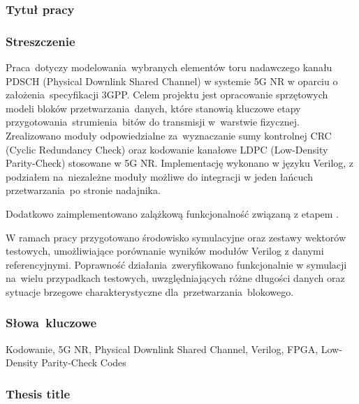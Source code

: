 \subsubsection*{Tytuł pracy} 
\Title

\subsubsection*{Streszczenie}  
Praca~dotyczy modelowania~wybranych elementów toru nadawczego kanału PDSCH (Physical Downlink Shared Channel) w systemie 5G NR w oparciu o założenia~specyfikacji 3GPP. Celem projektu jest opracowanie sprzętowych modeli bloków przetwarzania~danych, które stanowią kluczowe etapy przygotowania~strumienia~bitów do transmisji w~warstwie fizycznej. Zrealizowano moduły odpowiedzialne za~wyznaczanie sumy kontrolnej CRC (Cyclic Redundancy Check) oraz kodowanie kanałowe LDPC (Low-Density Parity-Check) stosowane w 5G NR. Implementację wykonano w języku Verilog, z podziałem na~niezależne moduły możliwe do integracji w jeden łańcuch przetwarzania~po stronie nadajnika.

Dodatkowo zaimplementowano zalążkową funkcjonalność związaną z etapem .

W ramach pracy przygotowano środowisko symulacyjne oraz zestawy wektorów testowych, umożliwiające porównanie wyników modułów Verilog z danymi referencyjnymi. Poprawność działania~zweryfikowano funkcjonalnie w symulacji na~wielu przypadkach testowych, uwzględniających różne długości danych oraz sytuacje brzegowe charakterystyczne dla~przetwarzania~blokowego.

\subsubsection*{Słowa~kluczowe} 
Kodowanie, 5G NR, Physical Downlink Shared Channel, Verilog, FPGA, Low-Density Parity-Check Codes

\subsubsection*{Thesis title} 
\begin{otherlanguage}{british}
\TitleAlt
\end{otherlanguage}

